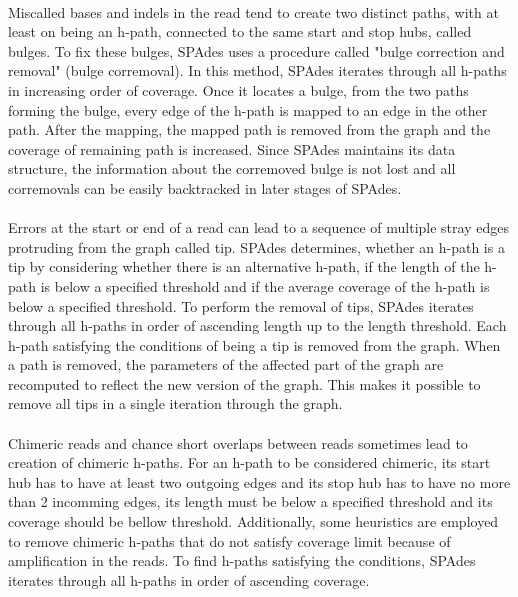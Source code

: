 \paragraph*{}
Miscalled bases and indels in the read tend to create two distinct paths, with at least on being an h-path, connected to the same start and stop hubs, called bulges. To fix these bulges, SPAdes uses a procedure called "bulge correction and removal" (bulge corremoval). In this method, SPAdes iterates through all h-paths in increasing order of coverage. Once it locates a bulge, from the two paths forming the bulge, every edge of the h-path is mapped to an edge in the other path. After the mapping, the mapped path is removed from the graph and the coverage of remaining path is increased. Since SPAdes maintains its data structure, the information about the corremoved bulge is not lost and all corremovals can be easily backtracked in later stages of SPAdes.
\paragraph*{}
Errors at the start or end of a read can lead to a sequence of multiple stray edges protruding from the graph called tip. SPAdes determines, whether an h-path is a tip by considering whether there is an alternative h-path, if the length of the h-path is below a specified threshold and if the average coverage of the h-path is below a specified threshold. To perform the removal of tips, SPAdes iterates through all h-paths in order of ascending length up to the length threshold. Each h-path satisfying the conditions of being a tip is removed from the graph. When a path is removed, the parameters of the affected part of the graph are recomputed to reflect the new version of the graph. This makes it possible to remove all tips in a single iteration through the graph.
\paragraph*{}
Chimeric reads and chance short overlaps between reads sometimes lead to creation of chimeric h-paths. For an h-path to be considered chimeric, its start hub has to have at least two outgoing edges and its stop hub has to have no more than 2 incomming edges, its length must be below a specified threshold and its coverage should be bellow threshold. Additionally, some heuristics are employed to remove chimeric h-paths that do not satisfy coverage limit because of amplification in the reads. To find h-paths satisfying the conditions, SPAdes iterates through all h-paths in order of ascending coverage.
